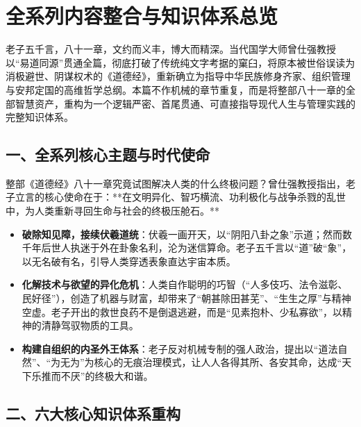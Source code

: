 \section*{全系列内容整合与知识体系总览}

老子五千言，八十一章，文约而义丰，博大而精深。当代国学大师曾仕强教授以“易道同源”贯通全篇，彻底打破了传统纯文字考据的窠臼，将原本被世俗误读为消极避世、阴谋权术的《道德经》，重新确立为指导中华民族修身齐家、组织管理与安邦定国的高维哲学总纲。本篇不作机械的章节重复，而是将整部八十一章的全部智慧资产，重构为一个逻辑严密、首尾贯通、可直接指导现代人生与管理实践的完整知识体系。

\clearpage

\subsection*{一、全系列核心主题与时代使命}

整部《道德经》八十一章究竟试图解决人类的什么终极问题？曾仕强教授指出，老子立言的核心使命在于：**在文明异化、智巧横流、功利极化与战争杀戮的乱世中，为人类重新寻回生命与社会的终极压舱石。**

\begin{itemize}
    \item \textbf{破除知见障，接续伏羲道统}：伏羲一画开天，以“阴阳八卦之象”示道；然而数千年后世人执迷于外在卦象名利，沦为迷信算命。老子五千言以“道”破“象”，以无名破有名，引导人类穿透表象直达宇宙本质。
    \item \textbf{化解技术与欲望的异化危机}：人类自作聪明的巧智（“人多伎巧、法令滋彰、民好径”），创造了机器与财富，却带来了“朝甚除田甚芜”、“生生之厚”与精神空虚。老子开出的救世良药不是倒退逃避，而是“见素抱朴、少私寡欲”，以精神的清静驾驭物质的工具。
    \item \textbf{构建自组织的内圣外王体系}：老子反对机械专制的强人政治，提出以“道法自然”、“为无为”为核心的无痕治理模式，让人人各得其所、各安其命，达成“天下乐推而不厌”的终极大和谐。
\end{itemize}

\subsection*{二、六大核心知识体系重构}

